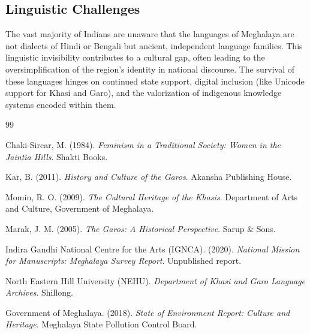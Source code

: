\documentclass[12pt]{article}
\begin{document}
\subsection{Linguistic Challenges}
The vast majority of Indians are unaware that the languages of Meghalaya are not dialects of Hindi or Bengali but ancient, independent language families. This linguistic invisibility contributes to a cultural gap, often leading to the oversimplification of the region's identity in national discourse. The survival of these languages hinges on continued state support, digital inclusion (like Unicode support for Khasi and Garo), and the valorization of indigenous knowledge systems encoded within them.

\begin{thebibliography}{99}

Chaki-Sircar, M. (1984). \textit{Feminism in a Traditional Society: Women in the Jaintia Hills}. Shakti Books.

Kar, B. (2011). \textit{History and Culture of the Garos}. Akansha Publishing House.

Momin, R. O. (2009). \textit{The Cultural Heritage of the Khasis}. Department of Arts and Culture, Government of Meghalaya.

Marak, J. M. (2005). \textit{The Garos: A Historical Perspective}. Sarup \& Sons.

Indira Gandhi National Centre for the Arts (IGNCA). (2020). \textit{National Mission for Manuscripts: Meghalaya Survey Report}. Unpublished report.

North Eastern Hill University (NEHU). \textit{Department of Khasi and Garo Language Archives}. Shillong.

Government of Meghalaya. (2018). \textit{State of Environment Report: Culture and Heritage}. Meghalaya State Pollution Control Board.

\end{thebibliography}
\end{document}
